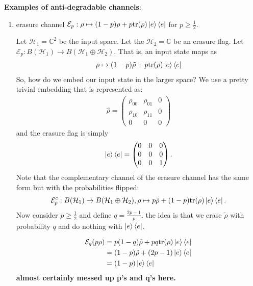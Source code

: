 \documentclass[10pt,oneside,longbibliography]{report}
\begin{document}
\noindent \textbf{Examples of anti-degradable channels}:
\begin{enumerate}
    \item erasure channel $\mathcal{E}_p: \rho \mapsto (1-p)\rho + p \text{tr}(\rho) \ket{e}\bra{e}$ for $p\geq \frac{1}{2}$. 
    
    Let $\mathcal{H}_1 = \mathbb{C}^2$ be the input space. Let the $\mathcal{H}_2=\mathbb{C}$ be an erasure flag. Let $\mathcal{E}_p : B(\mathcal{H}_1) \rightarrow B(\mathcal{H}_1 \oplus \mathcal{H}_2)$. That is, an input state maps as
    \begin{align}
        \rho \mapsto (1-p) \tilde{\rho} + p \text{tr}(\rho) \ket{e}\bra{e}
    \end{align}
    So, how do we embed our input state in the larger space? We use a pretty trivial embedding that is represented as:
    \begin{align}
        \hat{\rho} = \begin{pmatrix}
        \rho_{00} & \rho_{01} & 0 \\
        \rho_{10} & \rho_{11} & 0 \\
        0 & 0 & 0 
        \end{pmatrix}
    \end{align}
    and the erasure flag is simply
    \begin{align}
        \ket{e}\bra{e} =  \begin{pmatrix}
        0 & 0 & 0 \\
        0 & 0 & 0 \\
        0 & 0 & 1
        \end{pmatrix}.
    \end{align}
    Note that the complementary channel of the erasure channel has the same form but with the probabilities flipped:
    \begin{align}
        \mathcal{E}^c_p: B(\mathcal{H}_1) \rightarrow B(\mathcal{H}_1 \oplus \mathcal{H}_2 ), \rho \mapsto p \tilde{\rho} + (1-p) \text{tr}(\rho) \ket{e}\bra{e}.
    \end{align}
    Now consider $p\geq \frac{1}{2}$ and define $q=\frac{2p-1}{p}$. the idea is that we erase $\tilde{\rho}$ with probability $q$ and do nothing with $\ket{e}\bra{e}$.
    
    \begin{align}
        \mathcal{E}_q (p\rho) &= p(1-q) \tilde{\rho} + p q \text{tr}(\rho) \ket{e}\bra{e} \\
        &= (1-p) \tilde{\rho} + (2p-1) \ket{e}\bra{e} \\
        &= (1-p) \ket{e}\bra{e}
    \end{align}
    \textbf{almost certainly messed up p's and q's here.}
    

\end{enumerate}
\end{document}
